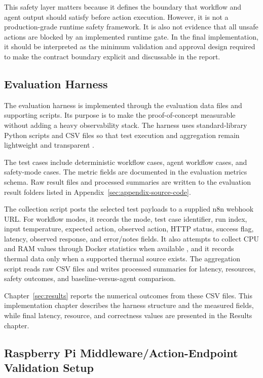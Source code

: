 This safety layer matters because it defines the boundary that workflow and agent output should satisfy before action execution. However, it is not a production-grade runtime safety framework. It is also not evidence that all unsafe actions are blocked by an implemented runtime gate. In the final implementation, it should be interpreted as the minimum validation and approval design required to make the contract boundary explicit and discussable in the report.

\subsection{Evaluation Harness}\label{subsec:implementation-evaluation-harness}

The evaluation harness is implemented through the evaluation data files and supporting scripts. Its purpose is to make the proof-of-concept measurable without adding a heavy observability stack. The harness uses standard-library Python scripts and CSV files so that test execution and aggregation remain lightweight and transparent \cite{pythonCsvDocs,csvRfc4180}.

The test cases include deterministic workflow cases, agent workflow cases, and safety-mode cases. The metric fields are documented in the evaluation metrics schema. Raw result files and processed summaries are written to the evaluation result folders listed in Appendix~\ref{sec:appendix-source-code}.

The collection script posts the selected test payloads to a supplied n8n webhook URL. For workflow modes, it records the mode, test case identifier, run index, input temperature, expected action, observed action, HTTP status, success flag, latency, observed response, and error/notes fields. It also attempts to collect CPU and RAM values through Docker statistics when available \cite{dockerStatsDocs}, and it records thermal data only when a supported thermal source exists. The aggregation script reads raw CSV files and writes processed summaries for latency, resources, safety outcomes, and baseline-versus-agent comparison.

Chapter~\ref{sec:results} reports the numerical outcomes from these CSV files. This implementation chapter describes the harness structure and the measured fields, while final latency, resource, and correctness values are presented in the Results chapter.

\subsection{Raspberry Pi Middleware/Action-Endpoint Validation Setup}\label{subsec:implementation-pi}

